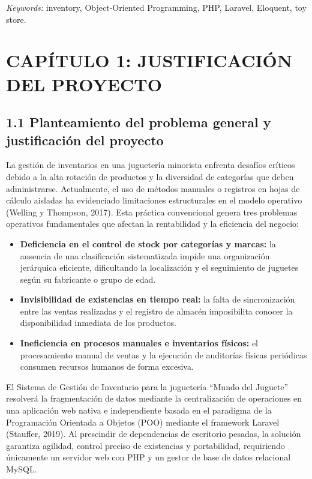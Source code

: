 \documentclass[12pt,a4paper]{article}
\begin{document}
\emph{Keywords:} inventory, Object-Oriented Programming, PHP, Laravel, Eloquent, toy store.

\clearpage

\setcounter{page}{1}
\section{CAP\'ITULO 1: JUSTIFICACI\'ON DEL PROYECTO}

\subsection{1.1 Planteamiento del problema general y justificaci\'on del proyecto}

La gesti\'on de inventarios en una jugueter\'ia minorista enfrenta desaf\'ios
cr\'iticos debido a la alta rotaci\'on de productos y la diversidad de categor\'ias
que deben administrarse. Actualmente, el uso de m\'etodos manuales o registros en
hojas de c\'alculo aisladas ha evidenciado limitaciones estructurales en el
modelo operativo (Welling y Thompson, 2017). Esta pr\'actica convencional genera
tres problemas operativos fundamentales que afectan la rentabilidad y la
eficiencia del negocio:

\begin{itemize}
  \item \textbf{Deficiencia en el control de stock por categor\'ias y marcas:}
        la ausencia de una clasificaci\'on sistematizada impide una organizaci\'on
        jer\'arquica eficiente, dificultando la localizaci\'on y el seguimiento de
        juguetes seg\'un su fabricante o grupo de edad.
  \item \textbf{Invisibilidad de existencias en tiempo real:} la falta de
        sincronizaci\'on entre las ventas realizadas y el registro de almac\'en
        imposibilita conocer la disponibilidad inmediata de los productos.
  \item \textbf{Ineficiencia en procesos manuales e inventarios f\'isicos:}
        el procesamiento manual de ventas y la ejecuci\'on de auditor\'ias f\'isicas
        peri\'odicas consumen recursos humanos de forma excesiva.
\end{itemize}

El Sistema de Gesti\'on de Inventario para la jugueter\'ia ``Mundo del Juguete'' resolver\'a la fragmentaci\'on
de datos mediante la centralizaci\'on de operaciones en una aplicaci\'on web
nativa e independiente basada en el paradigma de la Programaci\'on Orientada a
Objetos (POO) mediante el framework Laravel (Stauffer, 2019). Al prescindir de
dependencias de escritorio pesadas, la soluci\'on garantiza agilidad, control
preciso de existencias y portabilidad, requiriendo \'unicamente un servidor web
con PHP y un gestor de base de datos relacional MySQL.
\end{document}
